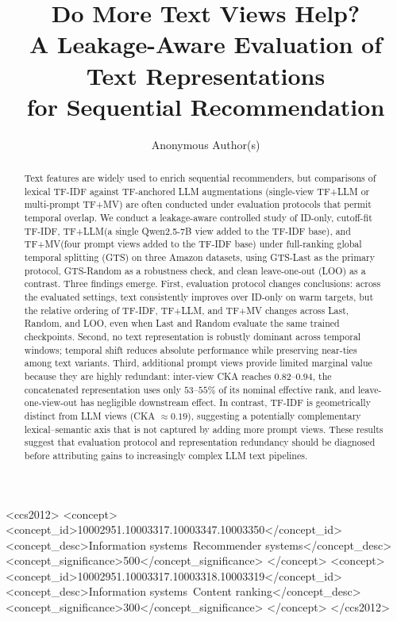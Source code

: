 \documentclass[sigconf,natbib=true,anonymous]{acmart}
\newcommand{\tfidf}{\textsc{TF-IDF}\xspace}
\newcommand{\tfllm}{\textsc{TF+LLM}\xspace}
\newcommand{\tfmv}{\textsc{TF+MV}\xspace}
\begin{document}
\title{Do More Text Views Help?\\
A Leakage-Aware Evaluation of Text Representations\\
for Sequential Recommendation}

\author{Anonymous Author(s)}
\renewcommand{\shortauthors}{Anonymous}

\begin{abstract}
Text features are widely used to enrich sequential recommenders, but comparisons of lexical \tfidf against TF-anchored LLM augmentations (single-view \tfllm or multi-prompt \tfmv) are often conducted under evaluation protocols that permit temporal overlap.
We conduct a leakage-aware controlled study of ID-only, cutoff-fit \tfidf, \tfllm (a single Qwen2.5-7B view added to the \tfidf base), and \tfmv (four prompt views added to the \tfidf base) under full-ranking global temporal splitting (GTS) on three Amazon datasets, using GTS-Last as the primary protocol, GTS-Random as a robustness check, and clean leave-one-out (LOO) as a contrast.
Three findings emerge.
First, evaluation protocol changes conclusions: across the evaluated settings, text consistently improves over ID-only on warm targets, but the relative ordering of \tfidf, \tfllm, and \tfmv changes across Last, Random, and LOO, even when Last and Random evaluate the same trained checkpoints.
Second, no text representation is robustly dominant across temporal windows; temporal shift reduces absolute performance while preserving near-ties among text variants.
Third, additional prompt views provide limited marginal value because they are highly redundant: inter-view CKA reaches $0.82$--$0.94$, the concatenated representation uses only $53$--$55\%$ of its nominal effective rank, and leave-one-view-out has negligible downstream effect.
In contrast, TF-IDF is geometrically distinct from LLM views (CKA $\approx 0.19$), suggesting a potentially complementary lexical--semantic axis that is not captured by adding more prompt views.
These results suggest that evaluation protocol and representation redundancy should be diagnosed before attributing gains to increasingly complex LLM text pipelines.
\end{abstract}

\begin{CCSXML}
<ccs2012>
 <concept>
  <concept_id>10002951.10003317.10003347.10003350</concept_id>
  <concept_desc>Information systems~Recommender systems</concept_desc>
  <concept_significance>500</concept_significance>
 </concept>
 <concept>
  <concept_id>10002951.10003317.10003318.10003319</concept_id>
  <concept_desc>Information systems~Content ranking</concept_desc>
  <concept_significance>300</concept_significance>
 </concept>
</ccs2012>
\end{CCSXML}
\end{document}
